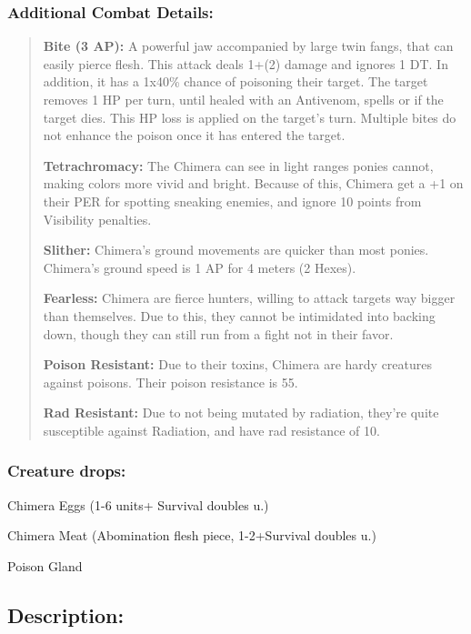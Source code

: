 \documentclass[11pt,a4paper,twocolumn]{book}
\begin{document}
	\subsubsection*{Additional Combat Details:}
	\begin{verse}
		\textbf{Bite (3 AP):} A powerful jaw accompanied by large twin fangs, that can easily pierce flesh. This attack deals 1+(2) damage and ignores 1 DT. In addition, it has a 1x40\% chance of poisoning their target. The target removes 1 HP per turn, until healed with an Antivenom, spells or if the target dies. This HP loss is applied on the target's turn. Multiple bites do not enhance the poison once it has entered the target.
		
		\textbf{Tetrachromacy:} The Chimera can see in light ranges ponies cannot, making colors more vivid and bright. Because of this, Chimera get a +1 on their PER for spotting sneaking enemies, and ignore 10 points from Visibility penalties.
		
		\textbf{Slither:} Chimera's ground movements are quicker than most ponies. Chimera's ground speed is 1 AP for 4 meters (2 Hexes).
		
		\textbf{Fearless:} Chimera are fierce hunters, willing to attack targets way bigger than themselves. Due to this, they cannot be intimidated into backing down, though they can still run from a fight not in their favor.
		
		\textbf{Poison Resistant:} Due to their toxins, Chimera are hardy creatures against poisons. Their poison resistance is 55.
		
		\textbf{Rad Resistant:} Due to not being mutated by radiation, they're quite susceptible against Radiation, and have rad resistance of 10.
	\end{verse}
	
	\subsubsection*{Creature drops:}
	\begin{compactitem}
		\item Chimera Eggs (1-6 units+ Survival doubles u.)
		\item Chimera Meat (Abomination flesh piece, 1-2+Survival doubles u.)
		\item Poison Gland
	\end{compactitem}	
	
	\subsection*{Description:}
	
\end{document}
